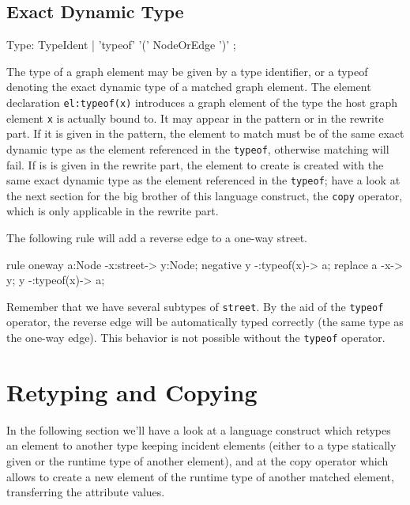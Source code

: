 \subsection{Exact Dynamic Type}\label{sec:typeof}

\begin{rail}
  Type: TypeIdent | 'typeof' '(' NodeOrEdge ')' ;
\end{rail}
The type of a graph element may be given by a type identifier,
or a typeof denoting the exact dynamic type of a matched graph element.
The element declaration \texttt{el:typeof(x)} introduces a graph element of the type the host graph element \texttt{x} is actually bound to. 
It may appear in the pattern or in the rewrite part.
If it is given in the pattern, the element to match must be of the same exact dynamic type as the element referenced in the \texttt{typeof}, otherwise matching will fail.
If is is given in the rewrite part, the element to create is created with the same exact dynamic type as the element referenced in the \texttt{typeof}; have a look at the next section for the big brother of this language construct, the \texttt{copy} operator, which is only applicable in the rewrite part.

\begin{example}
The following rule will add a reverse edge to a one-way street.
\begin{grgen}
rule oneway {
    a:Node -x:street-> y:Node;
    negative {
        y -:typeof(x)-> a;
    }
    replace {
        a -x-> y;
        y -:typeof(x)-> a;
    }
}
\end{grgen}
Remember that we have several subtypes of \texttt{street}. By the aid of the \texttt{typeof} operator, the reverse edge will be automatically typed correctly (the same type as the one-way edge). This behavior is not possible without the \texttt{typeof} operator.
\end{example}


\section{Retyping and Copying}

In the following section we'll have a look at a language construct which retypes an element to another type keeping incident elements (either to a type statically given or the runtime type of another element), and at the copy operator which allows to create a new element of the runtime type of another matched element, transferring the attribute values.

